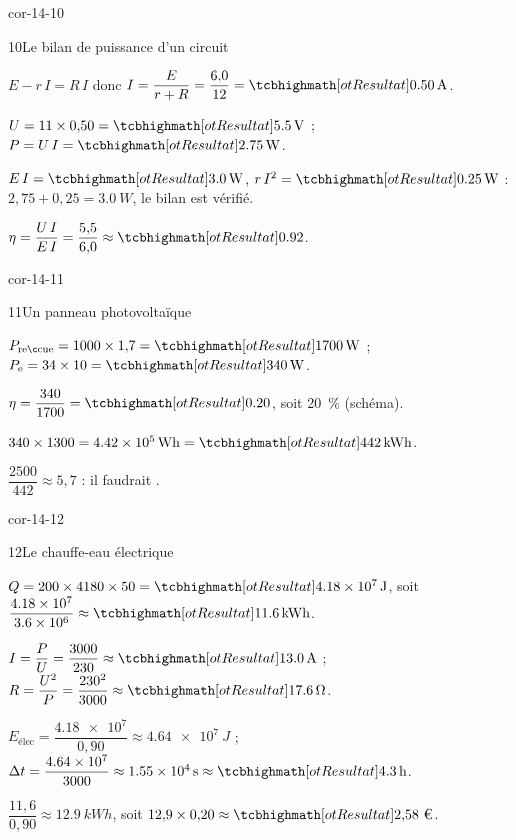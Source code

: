 \begin{blocLivre}{cor-14-10}
\begin{corrige}{10}{Le bilan de puissance d'un circuit}
\begin{questions}
\item $E-r\,I=R\,I$ donc $I=\dfrac{E}{r+R}=\dfrac{6{,}0}{12}=\res{\qty{0,50}{A}}$.
\item $U=11\times0{,}50=\res{\qty{5,5}{V}}$ ; $P=U\,I=\res{\qty{2,75}{W}}$.
\item $E\,I=\res{\qty{3,0}{W}}$, $r\,I^2=\res{\qty{0,25}{W}}$ : $2{,}75+0{,}25=\qty{3,0}{W}$, le bilan est vérifié.
\item $\eta=\dfrac{U\,I}{E\,I}=\dfrac{5{,}5}{6{,}0}\approx\res{\num{0,92}}$.
\end{questions}
\end{corrige}
\end{blocLivre}
\begin{blocLivre}{cor-14-11}
\begin{corrige}{11}{Un panneau photovoltaïque}
\begin{questions}
\item $P_\mathrm{reçue}=1000\times1{,}7=\res{\qty{1700}{W}}$ ; $P_\mathrm{e}=34\times10=\res{\qty{340}{W}}$.
\item $\eta=\dfrac{340}{1700}=\res{\num{0,20}}$, soit \qty{20}{\percent} (schéma).
\item $340\times1300=\qty{4,42e5}{Wh}=\res{\qty{442}{kWh}}$.
\item $\dfrac{2500}{442}\approx5{,}7$ : il faudrait .
\end{questions}
\end{corrige}
\end{blocLivre}
\begin{blocLivre}{cor-14-12}
\begin{corrige}{12}{Le chauffe-eau électrique}
\begin{questions}
\item $Q=200\times4180\times50=\res{\qty{4,18e7}{J}}$, soit $\dfrac{\num{4,18e7}}{\num{3,6e6}}\approx\res{\qty{11,6}{kWh}}$.
\item $I=\dfrac{P}{U}=\dfrac{3000}{230}\approx\res{\qty{13,0}{A}}$ ; $R=\dfrac{U^2}{P}=\dfrac{230^2}{3000}\approx\res{\qty{17,6}{\ohm}}$.
\item $E_\mathrm{élec}=\dfrac{\num{4,18e7}}{0{,}90}\approx\qty{4,64e7}{J}$ ; $\Delta t=\dfrac{\num{4,64e7}}{3000}\approx\qty{1,55e4}{s}\approx\res{\qty{4,3}{h}}$.
\item $\dfrac{11{,}6}{0{,}90}\approx\qty{12,9}{kWh}$, soit $12{,}9\times0{,}20\approx\res{\text{2,58~€}}$.
\end{questions}
\end{corrige}
\end{blocLivre}
